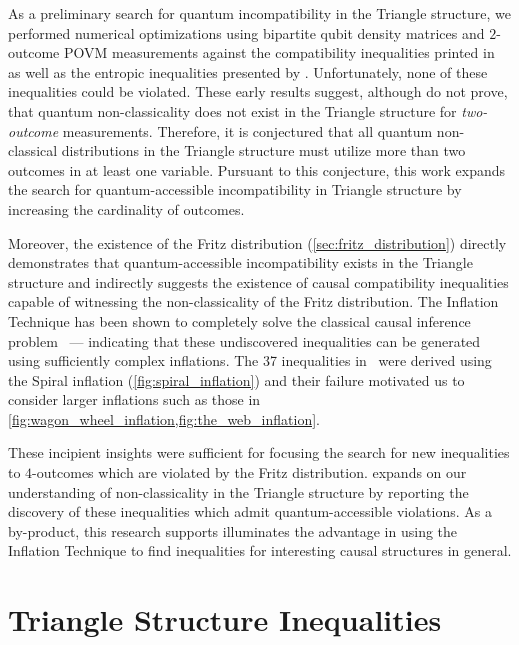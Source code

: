 \documentclass[aps, 10pt, english, twoside, pra, nofootinbib, tightenlines, longbibliography, superscriptaddress]{revtex4-1}
\begin{document}
    As a preliminary search for quantum incompatibility in the Triangle structure, we performed numerical optimizations using bipartite qubit density matrices and $2$-outcome POVM measurements against the compatibility inequalities printed in~\cite{Inflation} as well as the entropic inequalities presented by \citet{Henson_2014}. Unfortunately, none of these inequalities could be violated. These early results suggest, although do not prove, that quantum non-classicality does not exist in the Triangle structure for \textit{two-outcome} measurements. Therefore, it is conjectured that all quantum non-classical distributions in the Triangle structure must utilize more than two outcomes in at least one variable. Pursuant to this conjecture, this work expands the search for quantum-accessible incompatibility in Triangle structure by increasing the cardinality of outcomes.

    Moreover, the existence of the Fritz distribution (\cref{sec:fritz_distribution}) directly demonstrates that quantum-accessible incompatibility exists in the Triangle structure and indirectly suggests the existence of causal compatibility inequalities capable of witnessing the non-classicality of the Fritz distribution. The Inflation Technique has been shown to completely solve the classical causal inference problem~\cite{Navascues_2017} --- indicating that these undiscovered inequalities can be generated using sufficiently complex inflations. The 37 inequalities in~\cite{Inflation} were derived using the Spiral inflation (\cref{fig:spiral_inflation}) and their failure motivated us to consider larger inflations such as those in \cref{fig:wagon_wheel_inflation,fig:the_web_inflation}.

    These incipient insights were sufficient for focusing the search for new inequalities to $4$-outcomes which are violated by the Fritz distribution.  expands on our understanding of non-classicality in the Triangle structure by reporting the discovery of these inequalities which admit quantum-accessible violations. As a by-product, this research supports illuminates the advantage in using the Inflation Technique to find inequalities for interesting causal structures in general.

    \section{Triangle Structure Inequalities}
    \label{sec:found_inequalities}
\end{document}
